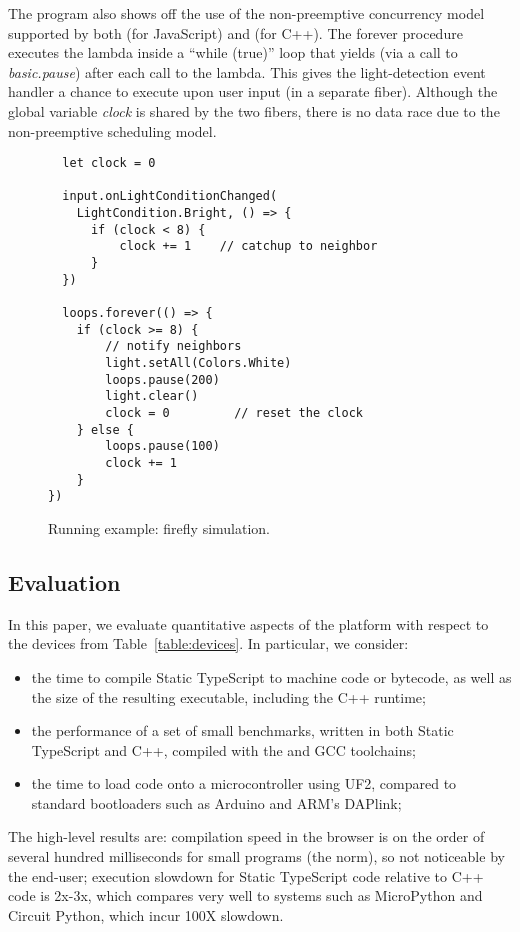 The program also shows off the use of the non-preemptive concurrency
model supported by both \MC (for JavaScript) and \CO (for C++).
The forever procedure executes the lambda inside a ``while (true)''
loop that yields (via a call to \emph{basic.pause}) after each call to the lambda.
This gives the light-detection event handler a chance to execute
upon user input (in a separate fiber). Although the global variable \emph{clock} is
shared by the two fibers, there is no data race due to the non-preemptive
scheduling model.

\begin{figure}
\begin{lstlisting}
  let clock = 0

  input.onLightConditionChanged(
    LightCondition.Bright, () => {
      if (clock < 8) {
          clock += 1    // catchup to neighbor
      }
  })

  loops.forever(() => {
    if (clock >= 8) {
        // notify neighbors
        light.setAll(Colors.White)  
        loops.pause(200)
        light.clear()
        clock = 0         // reset the clock
    } else {
        loops.pause(100)
        clock += 1         
    }
})
\end{lstlisting}
\caption{\label{fig:example}Running example: firefly simulation.}
\end{figure}


\subsection{Evaluation}

In this paper, we evaluate quantitative aspects of the platform
with respect to the devices from Table~\ref{table:devices}. In particular, we
consider:
\begin{itemize}
\item the time to compile Static TypeScript to machine code or bytecode,
       as well as the size of the resulting executable, including the C++ runtime;
\item the performance of a set of small benchmarks, written in both Static TypeScript and C++,
      compiled with the \MC and GCC toolchains;
\item the time to load code onto a microcontroller using UF2, compared to standard bootloaders
      such as Arduino and ARM's DAPlink;
\end{itemize}
The high-level results are: compilation speed in the browser is on the order
of several hundred milliseconds for small programs (the norm), so not noticeable 
by the end-user; execution slowdown for Static TypeScript code relative to C++
code is 2x-3x, which compares very well to systems such as MicroPython and
Circuit Python, which incur 100X slowdown. 

